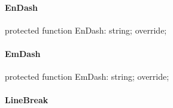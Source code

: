 \documentclass{report}
\newif\ifpdf
\begin{document}
\paragraph*{EnDash}\hspace*{\fill}

\label{PasDoc_GenHtml.TGenericHTMLDocGenerator-EnDash}
\begin{list}{}{
\setlength{\itemindent}{0cm}
\setlength{\listparindent}{0cm}
\setlength{\leftmargin}{\evensidemargin}
\addtolength{\leftmargin}{\tmplength}
\settowidth{\labelsep}{X}
\addtolength{\leftmargin}{\labelsep}
\setlength{\labelwidth}{\tmplength}
}
\item[\textbf{Declaration}\hfill]
\ifpdf
\begin{flushleft}
\fi
\begin{ttfamily}
protected function EnDash: string; override;\end{ttfamily}

\ifpdf
\end{flushleft}
\fi

\end{list}
\paragraph*{EmDash}\hspace*{\fill}

\label{PasDoc_GenHtml.TGenericHTMLDocGenerator-EmDash}
\begin{list}{}{
\setlength{\itemindent}{0cm}
\setlength{\listparindent}{0cm}
\setlength{\leftmargin}{\evensidemargin}
\addtolength{\leftmargin}{\tmplength}
\settowidth{\labelsep}{X}
\addtolength{\leftmargin}{\labelsep}
\setlength{\labelwidth}{\tmplength}
}
\item[\textbf{Declaration}\hfill]
\ifpdf
\begin{flushleft}
\fi
\begin{ttfamily}
protected function EmDash: string; override;\end{ttfamily}

\ifpdf
\end{flushleft}
\fi

\end{list}
\paragraph*{LineBreak}\hspace*{\fill}
\end{document}
